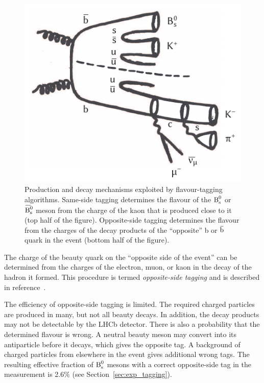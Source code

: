 \begin{figure}[tbp]
  \centering
  \includegraphics{graphics/intro/tikz/tagging}
  \caption{Production and decay mechanisms exploited by flavour-tagging algorithms.
           Same-side tagging determines the flavour of the $\text{B}_\text{s}^\text{0}$ or $\Bsbar$ meson from the charge of the kaon that is produced close to it
           (top half of the figure).
           Opposite-side tagging determines the flavour from the charges of the decay products of the ``opposite'' b or $\qbar[b]$ quark in
           the event
           (bottom half of the figure).}
  \label{fig:tagging}
\end{figure}

The charge of the beauty quark on the ``opposite side of the event'' can be determined from the charges of the electron, muon, or kaon in
the decay of the hadron it formed. This procedure is termed \emph{opposite-side tagging} and is described in
reference~\cite{LHCb-PAPER-2011-027}.

The efficiency of opposite-side tagging is limited. The required charged particles are produced in many, but not all beauty decays. In
addition, the decay products may not be detectable by the LHCb detector. There is also a probability that the determined flavour is wrong.
A neutral beauty meson may convert into its antiparticle before it decays, which gives the opposite tag. A background of charged particles
from elsewhere in the event gives additional wrong tags. The resulting effective fraction of $\text{B}_\text{s}^\text{0}$ mesons with a correct opposite-side tag
in the \BstoJpsiKK{} measurement is 2.6\% (see Section~\ref{sec:exp_tagging}).

